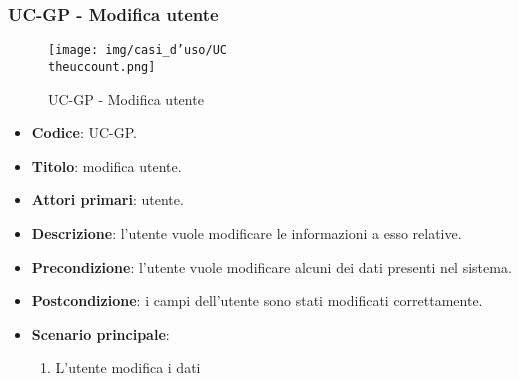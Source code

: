 \subsubsection{UC\theuccount-GP - Modifica utente}
		\begin{figure}[H]
			\centering
				\texttt{[image: img/casi\_d'uso/UC\\theuccount.png]}\\
			\caption{UC\theuccount-GP - Modifica utente}
		\end{figure}
	\begin{itemize}
		\item \textbf{Codice}: UC\theuccount-GP.
		\item \textbf{Titolo}: modifica utente.
		\item \textbf{Attori primari}: utente.
		\item \textbf{Descrizione}: l’utente vuole modificare le informazioni a esso relative.
		\item \textbf{Precondizione}: l'utente vuole modificare alcuni dei dati presenti nel sistema.
		\item \textbf{Postcondizione}: i campi dell'utente sono stati modificati correttamente.
		\item \textbf{Scenario principale}:
		\begin{enumerate}
			\item L'utente modifica i dati
		\end{enumerate}
	\end{itemize}


